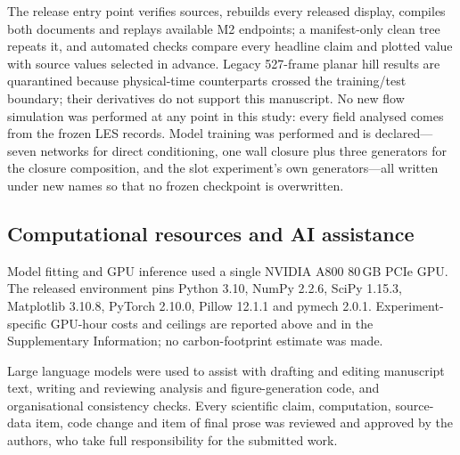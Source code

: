 The release entry point verifies sources, rebuilds every released display, compiles both
documents and replays available M2 endpoints; a manifest-only clean tree repeats it, and
automated checks compare every headline claim and plotted value with source values selected in
advance.
Legacy 527-frame planar hill results are quarantined because physical-time counterparts crossed
the training/test boundary; their derivatives do not support this manuscript. No new flow
simulation was performed at any point in this study: every field analysed comes from the frozen
LES records. Model training was performed and is declared---seven networks for direct
conditioning, one wall closure plus three generators for the closure composition, and the slot
experiment's own generators---all written under new names so that no frozen checkpoint is
overwritten.

\subsection{Computational resources and AI assistance}

Model fitting and GPU inference used a single NVIDIA A800 80\,GB PCIe GPU. The released
environment pins Python 3.10, NumPy 2.2.6, SciPy 1.15.3, Matplotlib 3.10.8, PyTorch 2.10.0,
Pillow 12.1.1 and pymech 2.0.1. Experiment-specific GPU-hour costs and ceilings are reported
above and in the Supplementary Information; no carbon-footprint estimate was made.

Large language models were used to assist with drafting and editing manuscript text, writing and
reviewing analysis and figure-generation code, and organisational consistency checks. Every
scientific claim, computation, source-data item, code change and item of final prose was reviewed
and approved by the authors, who take full responsibility for the submitted work.
